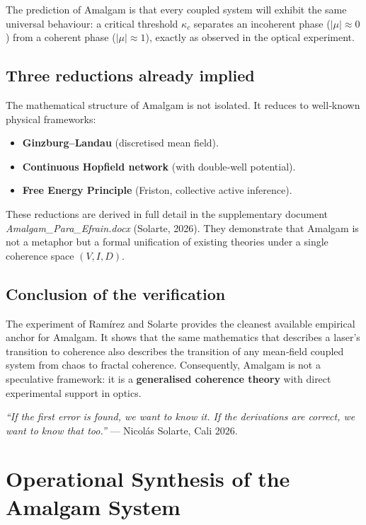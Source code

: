 \documentclass[12pt,oneside]{report}
\begin{document}
The prediction of Amalgam is that every coupled system will exhibit the same universal behaviour: a critical threshold \(\kappa_c\) separates an incoherent phase (\(|\mu|\approx 0\)) from a coherent phase (\(|\mu|\approx 1\)), exactly as observed in the optical experiment.

\section{Three reductions already implied}

The mathematical structure of Amalgam is not isolated. It reduces to well‑known physical frameworks:
\begin{itemize}
\item \textbf{Ginzburg–Landau} (discretised mean field).
\item \textbf{Continuous Hopfield network} (with double‑well potential).
\item \textbf{Free Energy Principle} (Friston, collective active inference).
\end{itemize}
These reductions are derived in full detail in the supplementary document \textit{Amalgam\_Para\_Efrain.docx} (Solarte, 2026). They demonstrate that Amalgam is not a metaphor but a formal unification of existing theories under a single coherence space \((V,I,D)\).

\section{Conclusion of the verification}
The experiment of Ramírez and Solarte provides the cleanest available empirical anchor for Amalgam. It shows that the same mathematics that describes a laser’s transition to coherence also describes the transition of any mean‑field coupled system from chaos to fractal coherence. Consequently, Amalgam is not a speculative framework: it is a \textbf{generalised coherence theory} with direct experimental support in optics.

\vspace{0.5cm}
\noindent\textit{“If the first error is found, we want to know it. If the derivations are correct, we want to know that too.”}
— Nicolás Solarte, Cali 2026.

\chapter{Operational Synthesis of the Amalgam System}
\end{document}
